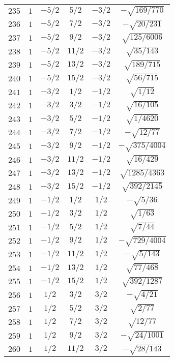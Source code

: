 \begin{table}
\begin{center}
\begin{tabular}{|c|c|c|c|c|c|}
$235$ & $1$ & $-5/2$ & $5/2$ & $-3/2$ & $-\sqrt{169/770}$ \\ 
$236$ & $1$ & $-5/2$ & $7/2$ & $-3/2$ & $-\sqrt{20/231}$ \\ 
$237$ & $1$ & $-5/2$ & $9/2$ & $-3/2$ & $\sqrt{125/6006}$ \\ 
$238$ & $1$ & $-5/2$ & $11/2$ & $-3/2$ & $\sqrt{35/143}$ \\ 
$239$ & $1$ & $-5/2$ & $13/2$ & $-3/2$ & $\sqrt{189/715}$ \\ 
$240$ & $1$ & $-5/2$ & $15/2$ & $-3/2$ & $\sqrt{56/715}$ \\ 
$241$ & $1$ & $-3/2$ & $1/2$ & $-1/2$ & $\sqrt{1/12}$ \\ 
$242$ & $1$ & $-3/2$ & $3/2$ & $-1/2$ & $\sqrt{16/105}$ \\ 
$243$ & $1$ & $-3/2$ & $5/2$ & $-1/2$ & $\sqrt{1/4620}$ \\ 
$244$ & $1$ & $-3/2$ & $7/2$ & $-1/2$ & $-\sqrt{12/77}$ \\ 
$245$ & $1$ & $-3/2$ & $9/2$ & $-1/2$ & $-\sqrt{375/4004}$ \\ 
$246$ & $1$ & $-3/2$ & $11/2$ & $-1/2$ & $\sqrt{16/429}$ \\ 
$247$ & $1$ & $-3/2$ & $13/2$ & $-1/2$ & $\sqrt{1285/4363}$ \\ 
$248$ & $1$ & $-3/2$ & $15/2$ & $-1/2$ & $\sqrt{392/2145}$ \\ 
$249$ & $1$ & $-1/2$ & $1/2$ & $1/2$ & $-\sqrt{5/36}$ \\ 
$250$ & $1$ & $-1/2$ & $3/2$ & $1/2$ & $\sqrt{1/63}$ \\ 
$251$ & $1$ & $-1/2$ & $5/2$ & $1/2$ & $\sqrt{7/44}$ \\ 
$252$ & $1$ & $-1/2$ & $9/2$ & $1/2$ & $-\sqrt{729/4004}$ \\ 
$253$ & $1$ & $-1/2$ & $11/2$ & $1/2$ & $-\sqrt{5/143}$ \\ 
$254$ & $1$ & $-1/2$ & $13/2$ & $1/2$ & $\sqrt{77/468}$ \\ 
$255$ & $1$ & $-1/2$ & $15/2$ & $1/2$ & $\sqrt{392/1287}$ \\ 
$256$ & $1$ & $1/2$ & $3/2$ & $3/2$ & $-\sqrt{4/21}$ \\ 
$257$ & $1$ & $1/2$ & $5/2$ & $3/2$ & $\sqrt{2/77}$ \\ 
$258$ & $1$ & $1/2$ & $7/2$ & $3/2$ & $\sqrt{12/77}$ \\ 
$259$ & $1$ & $1/2$ & $9/2$ & $3/2$ & $-\sqrt{24/1001}$ \\ 
$260$ & $1$ & $1/2$ & $11/2$ & $3/2$ & $-\sqrt{28/143}$ \\ 

\end{tabular}
\end{center}
\end{table}

